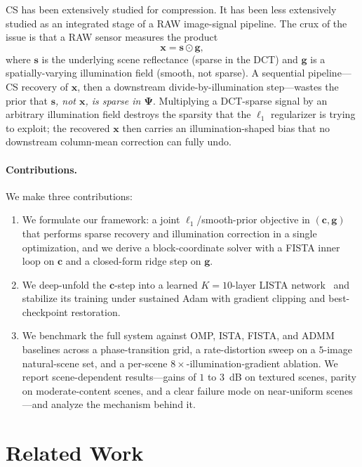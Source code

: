\documentclass{article}
\begin{document}
CS has been extensively studied for compression. It has been less extensively studied as an integrated stage of a RAW image-signal pipeline. The crux of the issue is that a RAW sensor measures the product
\begin{equation}
  \boldsymbol{x} = \boldsymbol{s} \odot \boldsymbol{g},
  \label{eq:image-formation}
\end{equation}
where $\boldsymbol{s}$ is the underlying scene reflectance (sparse in the DCT) and $\boldsymbol{g}$ is a spatially-varying illumination field (smooth, not sparse). A sequential pipeline---CS recovery of $\boldsymbol{x}$, then a downstream divide-by-illumination step---wastes the prior that \emph{$\boldsymbol{s}$, not $\boldsymbol{x}$, is sparse in $\boldsymbol{\Psi}$}. Multiplying a DCT-sparse signal by an arbitrary illumination field destroys the sparsity that the $\ell_1$ regularizer is trying to exploit; the recovered $\boldsymbol{x}$ then carries an illumination-shaped bias that no downstream column-mean correction can fully undo.

\paragraph{Contributions.} We make three contributions:
\begin{enumerate}[topsep=0pt,itemsep=0pt]
  \item We formulate our framework: a joint $\ell_1$/smooth-prior objective in $(\boldsymbol{c}, \boldsymbol{g})$ that performs sparse recovery and illumination correction in a single optimization, and we derive a block-coordinate solver with a FISTA inner loop on $\boldsymbol{c}$ and a closed-form ridge step on $\boldsymbol{g}$.
  \item We deep-unfold the $\boldsymbol{c}$-step into a learned $K{=}10$-layer LISTA network~\citep{gregor2010lista} and stabilize its training under sustained Adam with gradient clipping and best-checkpoint restoration.
  \item We benchmark the full system against OMP, ISTA, FISTA, and ADMM baselines across a phase-transition grid, a rate-distortion sweep on a $5$-image natural-scene set, and a per-scene $8\times$-illumination-gradient ablation. We report scene-dependent results---gains of $1$ to $3$~dB on textured scenes, parity on moderate-content scenes, and a clear failure mode on near-uniform scenes---and analyze the mechanism behind it.
\end{enumerate}

\section{Related Work}
\label{sec:related}
\end{document}
